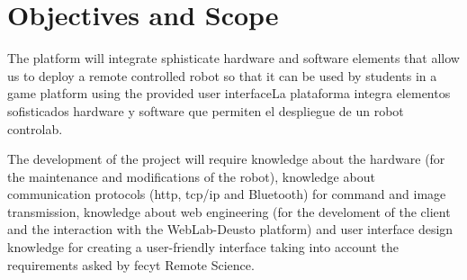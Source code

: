 \chapter{Objectives and Scope}

The platform will integrate sphisticate hardware and software elements that allow us to deploy a
remote controlled robot so that it can be used by students in a game platform using the provided
user interfaceLa plataforma integra elementos sofisticados hardware y software que permiten el despliegue de un
robot controlab.

The development of the project will require knowledge about the hardware (for the maintenance and
modifications of the robot), knowledge about communication protocols (\acrshort{http},
\acrshort{tcp}/\acrshort{ip} and Bluetooth) for command and image transmission, knowledge about web
engineering (for the develoment of the client and the interaction with the WebLab-Deusto platform)
and user interface design knowledge for creating a user-friendly interface taking into account the
requirements asked by \acrshort{fecyt} Remote Science.

